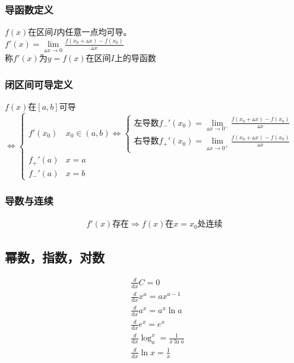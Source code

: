 \subsubsection{导函数定义}
$f(x)$在区间$I$内任意一点均可导。\\
$f'(x)=\lim\limits_{\vartriangle x\to 0}\frac{f(x_0+\vartriangle x)-f(x_0)}{\vartriangle x}$\\
称$f'(x)$为$y=f(x)$在区间$I$上的导函数
\subsubsection{闭区间可导定义}
$f(x)$在$[a,b]$可导$\Leftrightarrow\begin{cases}
  f'(x_0)  &x_0\in(a,b)\Leftrightarrow\begin{cases}
    \mbox{左导数}f_-'(x_0)=\lim\limits_{\vartriangle x\to 0^-}\frac{f(x_0+\vartriangle x)-f(x_0)}{\vartriangle x}\\
    \mbox{右导数}f_+'(x_0)=\lim\limits_{\vartriangle x\to 0^+}\frac{f(x_0+\vartriangle x)-f(x_0)}{\vartriangle x}
  \end{cases}\\
  f_+'(a) &x=a\\
  f_-'(a) &x=b
\end{cases}$
\subsubsection{导数与连续}
\begin{align}\label{derivative_continuity}
  f'(x)\mbox{存在}\Rightarrow f(x)\mbox{在}x=x_0\mbox{处连续}
\end{align}
\subsection{幂数，指数，对数}
\begin{align}
&\frac{d}{\mathrm{d}{x}}C = 0\label{derivative_1} \\
&\frac{d}{\mathrm{d}{x}}x^a = ax^{a-1} \label{derivative_2} \\
&\frac{d}{\mathrm{d}{x}}a^x = a^x\ln a \label{derivative_3}\\
&\frac{d}{\mathrm{d}{x}}e^x = e^x \label{derivative_4}\\
&\frac{d}{\mathrm{d}{x}}\log_a^x = \frac{1}{x\ln a} \label{derivative_5}\\
&\frac{d}{\mathrm{d}{x}} \ln{x} = \frac{1}{x} \label{derivative_6}
\end{align}

